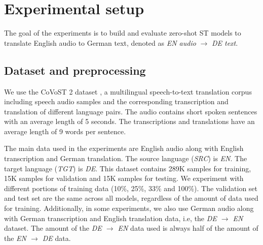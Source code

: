 \documentclass[conference]{IEEEtran}
\begin{document}
	\section{Experimental setup} \label{sec:exp_setup}
	The goal of the experiments is to build and evaluate zero-shot ST models to translate English audio to German text, denoted as \textit{EN audio} $\rightarrow$ \textit{DE text}.
	
	\subsection{Dataset and preprocessing}
	We use the CoVoST 2 dataset \cite{wang2020covost}, a multilingual speech-to-text translation corpus including speech audio samples and the corresponding transcription and translation of different language pairs. The audio contains short spoken sentences with an average length of 5 seconds. The transcriptions and translations have an average length of 9 words per sentence.
	
	The main data used in the experiments are English audio along with English transcription and German translation. The source language (\textit{SRC}) is \textit{EN}. The target language (\textit{TGT}) is \textit{DE}. This dataset contains 289K samples for training, 15K samples for validation and 15K samples for testing.
	We experiment with different portions of training data (10\%, 25\%, 33\% and 100\%). The validation set and test set are the same across all models, regardless of the amount of data used for training.
	Additionally, in some experiments, we also use German audio along with German transcription and English translation data, i.e, the \textit{DE $\rightarrow$ EN} dataset. The amount of the \textit{DE $\rightarrow$ EN} data used is always half of the amount of the \textit{EN $\rightarrow$ DE} data.
	
\end{document}

